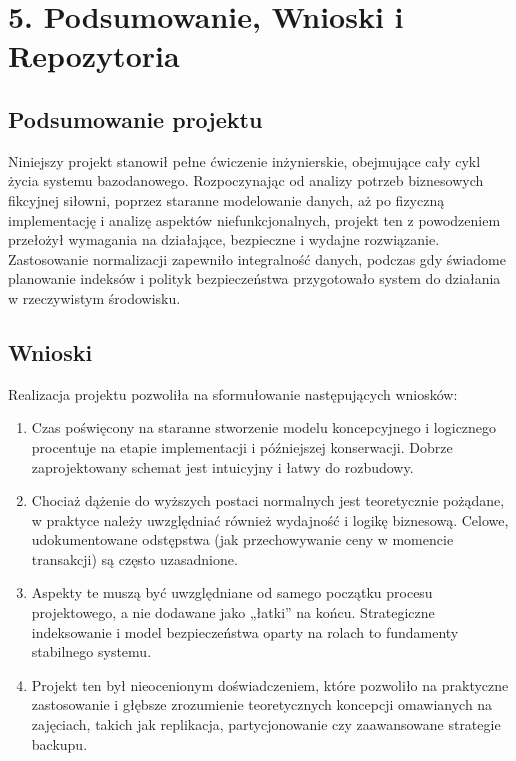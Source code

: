 \documentclass[letterpaper,10pt,polish]{sphinxmanual}
\begin{document}
\sphinxstepscope


\chapter{5. Podsumowanie, Wnioski i Repozytoria}
\label{\detokenize{rozdzial5/rozdzial5:podsumowanie-wnioski-i-repozytoria}}\label{\detokenize{rozdzial5/rozdzial5::doc}}

\section{Podsumowanie projektu}
\label{\detokenize{rozdzial5/rozdzial5:podsumowanie-projektu}}
\sphinxAtStartPar
Niniejszy projekt stanowił pełne ćwiczenie inżynierskie, obejmujące cały cykl życia systemu bazodanowego. Rozpoczynając od analizy potrzeb biznesowych fikcyjnej siłowni, poprzez staranne modelowanie danych, aż po fizyczną implementację i analizę aspektów niefunkcjonalnych, projekt ten z powodzeniem przełożył wymagania na działające, bezpieczne i wydajne rozwiązanie. Zastosowanie normalizacji zapewniło integralność danych, podczas gdy świadome planowanie indeksów i polityk bezpieczeństwa przygotowało system do działania w rzeczywistym środowisku.


\section{Wnioski}
\label{\detokenize{rozdzial5/rozdzial5:wnioski}}
\sphinxAtStartPar
Realizacja projektu pozwoliła na sformułowanie następujących wniosków:
\begin{enumerate}
%
\item {} 
\sphinxAtStartPar
{} Czas poświęcony na staranne stworzenie modelu koncepcyjnego i logicznego procentuje na etapie implementacji i późniejszej konserwacji. Dobrze zaprojektowany schemat jest intuicyjny i łatwy do rozbudowy.

\item {} 
\sphinxAtStartPar
{} Chociaż dążenie do wyższych postaci normalnych jest teoretycznie pożądane, w praktyce należy uwzględniać również wydajność i logikę biznesową. Celowe, udokumentowane odstępstwa (jak przechowywanie ceny w momencie transakcji) są często uzasadnione.

\item {} 
\sphinxAtStartPar
{} Aspekty te muszą być uwzględniane od samego początku procesu projektowego, a nie dodawane jako „łatki” na końcu. Strategiczne indeksowanie i model bezpieczeństwa oparty na rolach to fundamenty stabilnego systemu.

\item {} 
\sphinxAtStartPar
{} Projekt ten był nieocenionym doświadczeniem, które pozwoliło na praktyczne zastosowanie i głębsze zrozumienie teoretycznych koncepcji omawianych na zajęciach, takich jak replikacja, partycjonowanie czy zaawansowane strategie backupu.

\end{enumerate}
\end{document}
